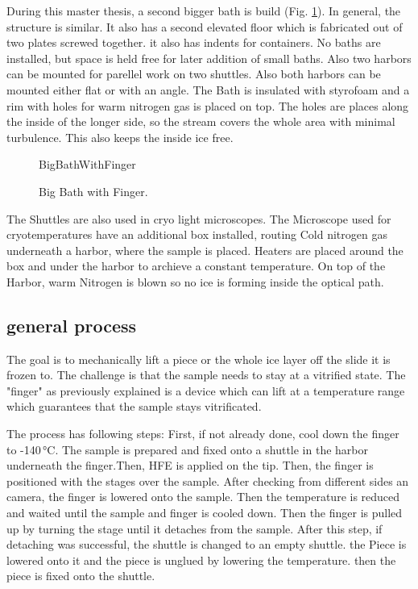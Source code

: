 During this master thesis, a second bigger bath is build (Fig. \ref{fig:GroßesBadMitFinger}). In general, the structure is similar. It also has a second elevated floor which is fabricated out of two plates screwed together. it also has indents for containers. No baths are installed, but space is held free for later addition of small baths. Also two harbors can be mounted for parellel work on two shuttles. Also both harbors can be mounted either flat or with an angle. The Bath is insulated with styrofoam and a rim with holes for warm nitrogen gas is placed on top. The holes are places along the inside of the longer side, so the stream covers the whole area with minimal turbulence. This also keeps the inside ice free.

\begin{figure}[hbt!]
	\centering
	\begin{overpic}[width=7cm,grid]{BigBathWithFinger}
		
	\end{overpic}
	\caption{Big Bath with Finger.}
	\label{fig:GroßesBadMitFinger}
\end{figure}

The Shuttles are also used in cryo light microscopes. The Microscope used for cryotemperatures have an additional box installed, routing Cold nitrogen gas underneath a harbor, where the sample is placed. Heaters are placed around the box and under the harbor to archieve a constant temperature. On top of the Harbor, warm Nitrogen is blown so no ice is forming inside the optical path.

\FloatBarrier

\subsection{general process}

The goal is to mechanically lift a piece or the whole ice layer off the slide it is frozen to. The challenge is that the sample needs to stay at a vitrified state. The "finger" as previously explained is a device which can lift at a temperature range which guarantees that the sample stays vitrificated. 

The process has following steps: First, if not already done, cool down the finger to -140\,°C. The sample is prepared and fixed onto a shuttle in the harbor underneath  the finger.Then, HFE is applied on the tip. Then, the finger is positioned with the stages over the sample. After checking from different sides an camera, the finger is lowered onto the sample. Then the temperature is reduced and waited until the sample and finger is cooled down. Then the finger is pulled up by turning the stage until it detaches from the sample. After this step, if detaching was successful, the shuttle is changed to an empty shuttle. the Piece is lowered onto it and the piece is unglued by lowering the temperature. then the piece is fixed onto the shuttle.

